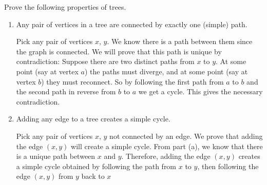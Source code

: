 \question Prove the following properties of trees.

\begin{enumerate}[label=\alph*]
\item Any pair of vertices in a tree are connected by exactly one 
(simple) path.

\begin{solution}[1.6 in]
Pick any pair of vertices $x$, $y$. We know there is a path between 
them since the graph is connected. We will prove that this path is 
unique by contradiction:
Suppose there are two distinct paths from $x$ to $y$. At some point 
(say at vertex $a$) the paths must diverge, and at some point (say at 
vertex $b$) they must reconnect. So by following the first path from 
$a$ to $b$ and the second path in reverse from $b$ to $a$ we get a 
cycle. This gives the necessary contradiction.
\end{solution}

\item Adding any edge to a tree creates a simple cycle.

\begin{solution}[1.6 in]
Pick any pair of vertices $x$, $y$ not connected by an edge. We prove 
that adding the edge $(x,y)$ will create a simple cycle. From part (a), 
we know that there is a unique path between $x$ and $y$. Therefore, 
adding the edge $(x,y)$ creates a simple cycle obtained by following 
the path from $x$ to $y$, then following the edge $(x, y)$ from $y$ 
back to $x$
\end{solution}
\end{enumerate}
